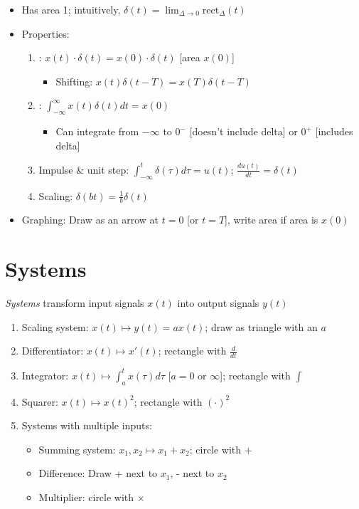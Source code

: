 \documentclass[12pt]{extarticle}
\begin{document}
\newp
{} \begin{itemize}
    \item Has area 1; intuitively, $\delta(t)=\lim_{\Delta\to0}\text{rect}_{\Delta}(t)$
    \item Properties: \begin{enumerate}
        \item {}: $x(t)\cdot\delta(t)=x(0)\cdot\delta(t)$ [area $x(0)$] \begin{itemize}
            \item Shifting: $x(t)\delta(t-T)=x(T)\delta(t-T)$
        \end{itemize}
        \item {}: $\int_{-\infty}^\infty x(t)\delta(t)dt=x(0)$ \begin{itemize}
            \item Can integrate from $-\infty$ to $0^{-}$ [doesn't include delta] or $0^{+}$ [includes delta]
        \end{itemize}
        \item Impulse \& unit step: $\int_{-\infty}^t\delta(\tau)d\tau=u(t)$; $\frac{du(t)}{dt}=\delta(t)$
        \item Scaling: $\delta(bt)=\frac{1}{b}\delta(t)$
    \end{enumerate}
    \item Graphing: Draw as an arrow at $t=0$ [or $t=T$], write area if area is $x(0)$
\end{itemize}


\pagebreak
\section{Systems}
\textit{Systems} transform input signals $x(t)$ into output signals $y(t)$ \begin{enumerate}
    \item Scaling system: $x(t)\mapsto y(t)=ax(t)$; draw as triangle with an $a$
    \item Differentiator: $x(t)\mapsto x'(t)$; rectangle with $\frac{d}{dt}$
    \item Integrator: $x(t)\mapsto \int_a^tx(\tau)d\tau$ [$a=0$ or $\infty$]; rectangle with $\int$
    \item Squarer: $x(t)\mapsto x(t)^2$; rectangle with $(\cdot)^2$
    \item Systems with multiple inputs: \begin{itemize}
        \item Summing system: $x_1,x_2\mapsto x_1+x_2$; circle with $+$
        \item Difference: Draw + next to $x_1$, - next to $x_2$
        \item Multiplier: circle with $\times$
    \end{itemize}
\end{enumerate}
\end{document}
